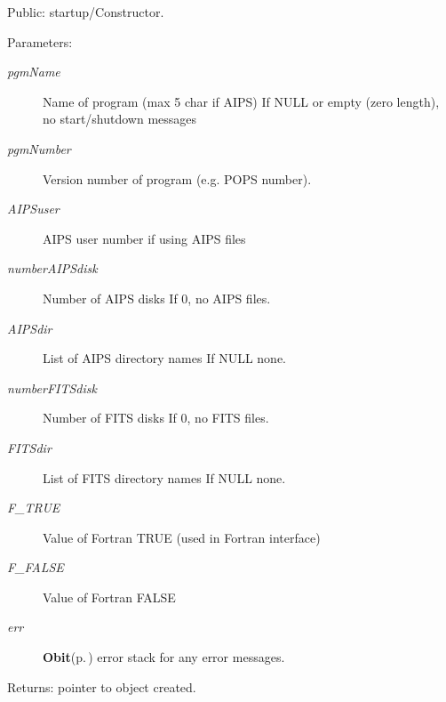 Public: startup/Constructor. 

\begin{Desc}
\item[Parameters:]
\begin{description}
\item[{\em pgm\-Name}]Name of program (max 5 char if AIPS) If NULL or empty (zero length), no start/shutdown messages \item[{\em pgm\-Number}]Version number of program (e.g. POPS number). \item[{\em AIPSuser}]AIPS user number if using AIPS files \item[{\em number\-AIPSdisk}]Number of AIPS disks If 0, no AIPS files. \item[{\em AIPSdir}]List of AIPS directory names If NULL none. \item[{\em number\-FITSdisk}]Number of FITS disks If 0, no FITS files. \item[{\em FITSdir}]List of FITS directory names If NULL none. \item[{\em F\_\-TRUE}]Value of Fortran TRUE (used in Fortran interface) \item[{\em F\_\-FALSE}]Value of Fortran FALSE \item[{\em err}]{\bf Obit}{\rm (p.\,\pageref{structObit})} error stack for any error messages. \end{description}
\end{Desc}
\begin{Desc}
\item[Returns:]pointer to object created. \end{Desc}
